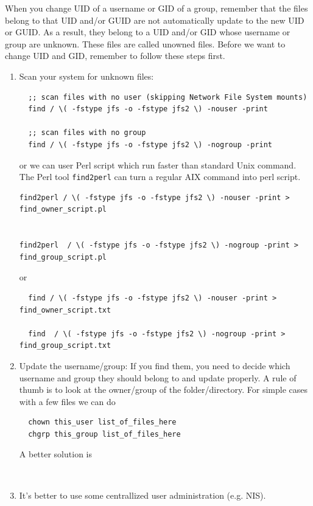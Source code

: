 When you change UID of a username or GID of a group, remember that the files
belong to that UID and/or GUID are not automatically update to the new UID or
GUID. As a result, they belong to a UID and/or GID whose username or group are
unknown. These files are called unowned files. Before we want to change UID and
GID, remember to follow these steps first.
\begin{enumerate}
  \item Scan your system for unknown files:
  \begin{verbatim}
  ;; scan files with no user (skipping Network File System mounts)
  find / \( -fstype jfs -o -fstype jfs2 \) -nouser -print
  
  ;; scan files with no group
  find / \( -fstype jfs -o -fstype jfs2 \) -nogroup -print 
  \end{verbatim}
  or we can user Perl script which run faster than standard Unix command. The
  Perl tool \verb!find2perl! can turn a regular AIX command into perl script.
  \begin{verbatim}
find2perl / \( -fstype jfs -o -fstype jfs2 \) -nouser -print >  find_owner_script.pl
  
  
find2perl  / \( -fstype jfs -o -fstype jfs2 \) -nogroup -print > find_group_script.pl
  \end{verbatim}
  or 
  \begin{verbatim}
  find / \( -fstype jfs -o -fstype jfs2 \) -nouser -print > find_owner_script.txt
  
  find  / \( -fstype jfs -o -fstype jfs2 \) -nogroup -print > find_group_script.txt
  \end{verbatim}	
  
  \item Update the username/group: If you find them, you need to decide which
  username and group they should belong to and update properly. A rule of thumb
  is to look at the owner/group of the folder/directory. For simple cases with a
  few files we can do
  \begin{verbatim}
  chown this_user list_of_files_here
  chgrp this_group list_of_files_here
  \end{verbatim}
  A better solution is
  \begin{verbatim}
  
  \end{verbatim}
  
  \item It's better to use some centrallized user administration (e.g. NIS). 
\end{enumerate}

